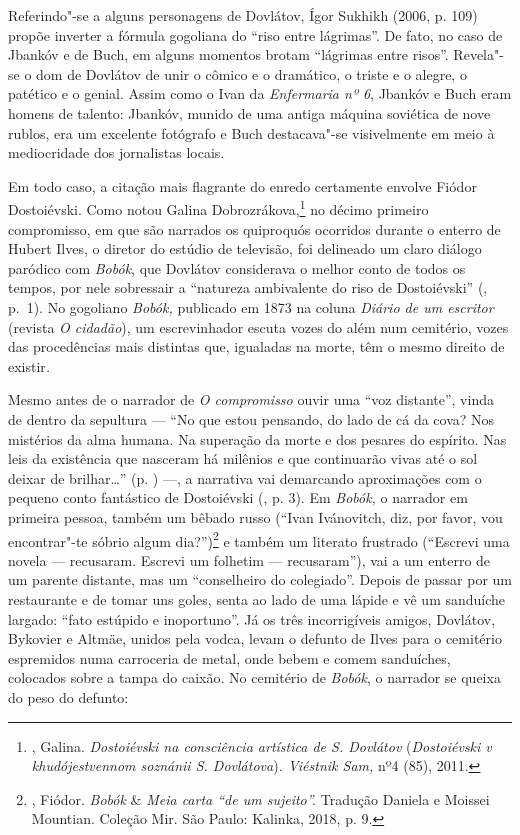 Referindo"-se a alguns personagens de Dovlátov, Ígor Sukhikh (2006, p.
109) propõe inverter a fórmula gogoliana do ``riso entre lágrimas''. De
fato, no caso de Jbankóv e de Buch, em alguns momentos brotam ``lágrimas
entre risos''. Revela"-se o dom de Dovlátov de unir o cômico e o
dramático, o triste e o alegre, o patético e o genial. Assim como o Ivan
da \emph{Enfermaria nº 6}, Jbankóv e Buch eram homens de talento:
Jbankóv, munido de uma antiga máquina soviética de nove rublos, era um
excelente fotógrafo e Buch destacava"-se visivelmente em meio à
mediocridade dos jornalistas locais.

Em todo caso, a citação mais flagrante do enredo certamente envolve
Fiódor Dostoiévski. Como notou Galina Dobrozrákova,\footnote{,
  Galina. \emph{Dostoiévski na consciência artística de S. Dovlátov}
  (\emph{Dostoiévski v khudójestvennom soznánii S. Dovlátova})\emph{.
  Viéstnik Sam,} nº4 (85), 2011.} no décimo primeiro
compromisso, em que são narrados os quiproquós ocorridos durante o
enterro de Hubert Ilves, o diretor do estúdio de televisão, foi
delineado um claro diálogo paródico com \emph{Bobók}, que Dovlátov
considerava o melhor conto de todos os tempos, por nele sobressair a
``natureza ambivalente do riso de Dostoiévski'' (, p.~1). No
gogoliano \emph{Bobók,} publicado em 1873 na coluna \emph{Diário de um
escritor} (revista \emph{O cidadão}), um escrevinhador escuta
vozes do além num cemitério, vozes das procedências mais distintas que,
igualadas na morte, têm o mesmo direito de existir\emph{. }

Mesmo antes de o narrador de \emph{O compromisso} ouvir uma ``voz
distante'', vinda de dentro da sepultura --- ``No que estou pensando, do
lado de cá da cova? Nos mistérios da alma humana. Na superação da morte
e dos pesares do espírito. Nas leis da existência que nasceram há
milênios e que continuarão vivas até o sol deixar de brilhar\ldots{}'' (p. \pageref{ref6})
---, a narrativa vai demarcando aproximações com o pequeno conto
fantástico de Dostoiévski (, p. 3). Em \emph{Bobók,} o
narrador em primeira pessoa, também um bêbado russo (``Ivan Ivánovitch,
diz, por favor, vou encontrar"-te sóbrio algum dia?'')\footnote{,
  Fiódor. \emph{Bobók} \& \emph{Meia carta ``de um sujeito''.} Tradução
  Daniela e Moissei Mountian. Coleção Mir. São Paulo: Kalinka, 2018, p.
  9.} e também um literato frustrado (``Escrevi uma novela ---
recusaram. Escrevi um folhetim --- recusaram''), vai a um enterro de um
parente distante, mas um ``conselheiro do colegiado''. Depois de passar
por um restaurante e de tomar uns goles, senta ao lado de uma lápide e
vê um sanduíche largado: ``fato estúpido e inoportuno''. Já os três
incorrigíveis amigos, Dovlátov, Bykovier e Altmäe, unidos pela vodca,
levam o defunto de Ilves para o cemitério espremidos numa carroceria de
metal, onde bebem e comem sanduíches, colocados sobre a tampa do caixão.
No cemitério de \emph{Bobók}, o narrador se queixa do peso do defunto:

